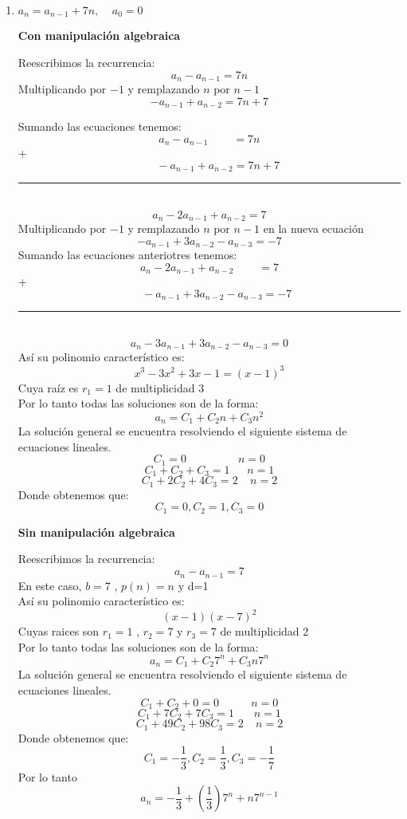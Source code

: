 \documentclass{article}
\theoremstyle{definition}
\theoremstyle{remark}
\begin{document}
\begin{enumerate}[1.]
\item  $a_{n}=a_{n-1}+7n,~~~~~a_{0}=0$

\begin{center}
\textbf{Con manipulaci\'on algebraica}\\
\end{center}

Reescribimos la recurrencia: \\
$$a_{n}-a_{n-1}=7n$$
Multiplicando por $-1$ y remplazando $n$ por $n-1$\\
$$-a_{n-1}+a_{n-2}=7n+7$$

Sumando las ecuaciones tenemos:\\
$$a_{n}-a_{n-1}~~~~~~~~~~=7n$$
+
$$~~~~~~~-a_{n-1}+a_{n-2}=7n+7$$
\rule{130mm}{0.1mm}\\
$$a_{n}-2a_{n-1}+a_{n-2}=7$$
Multiplicando por $-1$ y remplazando $n$ por $n-1$ en la nueva ecuaci\'on\\
$$-a_{n-1}+3a_{n-2}-a_{n-3}=-7$$
Sumando las ecuaciones anteriotres tenemos:\\
$$a_{n}-2a_{n-1}+a_{n-2}~~~~~~~~~~=7$$
+
$$~~~~~~-a_{n-1}+3a_{n-2}-a_{n-3}=-7$$
\rule{130mm}{0.1mm}\\
$$a_{n}-3a_{n-1}+3a_{n-2}-a_{n-3}=0$$
As\'i su polinomio caracter\'istico es:\\
$$ x^{3}-3x^{2}+3x-1= (x-1)^{3}$$
Cuya ra\'iz es $r_{1}=1$ de multiplicidad 3\\
Por lo tanto todas las soluciones son de la forma:\\
$$a_{n}=C_{1}+C_{2}n+C_{3}n^{2}$$
\clearpage
La soluci\'on general se encuentra resolviendo el siguiente sistema de ecuaciones lineales.\\
$$C_{1}=0~~~~~~~~~~~~~~~~~~~~~n=0$$
$$C_{1}+C_{2}+C_{3}=1~~~~~~~n=1$$
$$C_{1}+2C_{2}+4C_{3}=2~~~~~n=2$$
Donde obtenemos que:\\
$$C_{1}=0, C_{2}=1,  C_{3}=0$$

\clearpage
\begin{center}
\textbf{Sin manipulaci\'on algebraica}\\
\end{center}

Reescribimos la recurrencia: \\
$$a_{n}-a_{n-1}=7$$
En este caso, $b=7$ , $p(n)=n$ y d=1\\
As\'i su polinomio caracter\'istico es:\\
$$(x-1)(x-7)^{2}$$
Cuyas raices son $r_{1}=1$ , $r_{2}=7$ y $r_{3}=7$ de multiplicidad 2 \\
Por lo tanto todas las soluciones son de la forma:\\
$$a_{n}=C_{1}+C_{2}7^{n}+C_{3}n7^{n} $$
La soluci\'on general se encuentra resolviendo el siguiente sistema de ecuaciones lineales.\\
$$C_{1}+C_{2}+0=0~~~~~~~~~~~~~n=0$$
$$C_{1}+7C_{2}+7C_{3}=1~~~~~~~~n=1$$
$$C_{1}+49C_{2}+98C_{3}=2~~~~~n=2$$
Donde obtenemos que:\\
$$C_{1}=-\frac{1}{3}, C_{2}=\frac{1}{3},  C_{3}=-\frac{1}{7}$$
Por lo tanto\\
$$a_{n}=-\frac{1}{3}+(\frac{1}{3})7^{n}+n7^{n-1}$$
\clearpage





\end{enumerate}
\end{document}
